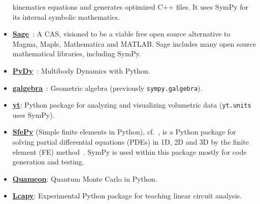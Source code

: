 \begin{itemize}
  kinematics equations and generates optimized C++ files. It uses SymPy for
  its internal symbolic mathematics.
\item
  \href{http://www.sagemath.org/}{\textbf{Sage}}~\cite{sagemath}: A CAS, visioned to be
  a viable free open source alternative to Magma, Maple, Mathematica and
  MATLAB\@. Sage includes many open source mathematical libraries, including
  SymPy.
\item
  \href{http://www.pydy.org/}{\textbf{PyDy}}~\cite{gede2013constrained}: Multibody Dynamics with
  Python.
\item
  \href{https://github.com/brombo/galgebra}{\textbf{galgebra}}~\cite{galgebra}:
  Geometric algebra (previously \texttt{sympy.galgebra}).
\item
  \href{http://yt-project.org/}{\textbf{yt}}: Python package for
  analyzing and visualizing volumetric data (\texttt{yt.units} uses SymPy).
\item
  \href{http://sfepy.org/}{\textbf{SfePy}} (Simple finite elements in Python),
  cf.~\cite{cimrman2014sfepy}, is a Python package for solving partial
  differential equations (PDEs) in 1D, 2D and 3D by the finite element (FE)
  method~\cite{Zienkiewicz2013FEM}. SymPy is used within this package mostly for
  code generation and testing.
\item
  \href{http://quameon.sourceforge.net/}{\textbf{Quameon}}: Quantum
  Monte Carlo in Python.
\item
  \href{http://lcapy.elec.canterbury.ac.nz/}{\textbf{Lcapy}}:
  Experimental Python package for teaching linear circuit analysis.
\end{itemize}

